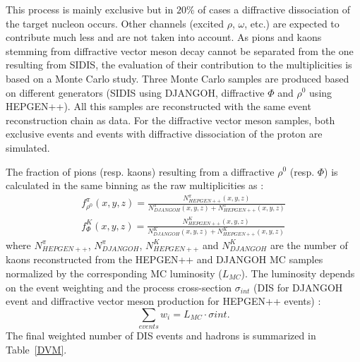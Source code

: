 This process is mainly exclusive but in $20$\% of cases a diffractive dissociation of the target nucleon occurs. Other channels (excited $\rho$, $\omega$, etc.) are expected to contribute much less and are not taken into account. As pions and kaons stemming from diffractive vector meson decay cannot be separated from the one resulting from SIDIS, the evaluation of their contribution to the multiplicities is based on a Monte Carlo study. Three Monte Carlo samples are produced based on different generators (SIDIS using DJANGOH, diffractive $\Phi$ and $\rho^0$ using HEPGEN++). All this samples are reconstructed with the same event reconstruction chain as data. For the diffractive vector meson samples, both exclusive events and events with diffractive dissociation of the proton are simulated.

The fraction of pions (resp. kaons) resulting from a diffractive $\rho^0$ (resp. $\Phi$) is calculated in the same binning as the raw multiplicities as :
%
\begin{equation}\label{eq:DVMhad}
  \begin{split}
    f^{\pi}_{\rho^0}(x,y,z) = \frac{N^{\pi}_{HEPGEN++}(x,y,z)}{N^{\pi}_{DJANGOH}(x,y,z)+N^{\pi}_{HEPGEN++}(x,y,z)} \\
    f^K_{\Phi}(x,y,z) = \frac{N^K_{HEPGEN++}(x,y,z)}{N^K_{DJANGOH}(x,y,z)+N^K_{HEPGEN++}(x,y,z)}
  \end{split}
\end{equation}
%
where $N^{\pi}_{HEPGEN++}$, $N^{\pi}_{DJANGOH}$, $N^K_{HEPGEN++}$ and $N^K_{DJANGOH}$ are the number of kaons reconstructed from the HEPGEN++ and DJANGOH MC samples normalized by the corresponding MC luminosity ($L_{MC}$). The luminosity depends on the event weighting and the process cross-section $\sigma_{int}$ (DIS for DJANGOH event and diffractive vector meson production for HEPGEN++ events) :
%
\begin{equation} \label{eq:reweight}
  \sum_{events} w_i = L_{MC} \cdot \sigma{int}.
\end{equation}
%
The final weighted number of DIS events and hadrons is summarized in Table~\ref{DVM}.

